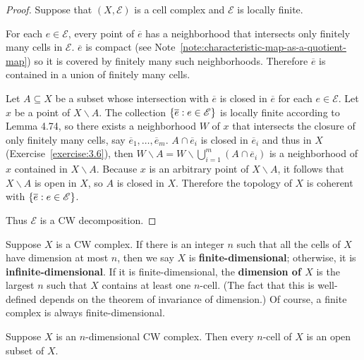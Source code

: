 \begin{proof}
	Suppose that $(X, \mathscr{E})$ is a cell complex and $\mathscr{E}$ is locally finite.

	For each $e\in \mathscr{E}$, every point of $\overline{e}$ has a neighborhood that intersects only finitely many cells in $\mathscr{E}$. $\overline{e}$ is compact (see Note~\ref{note:characteristic-map-as-a-quotient-map}) so it is covered by finitely many such neighborhoods. Therefore $\overline{e}$ is contained in a union of finitely many cells.

	Let $A \subseteq X$ be a subset whose intersection with $\overline{e}$ is closed in $\overline{e}$ for each $e\in \mathscr{E}$. Let $x$ be a point of $X\smallsetminus A$. The collection $\left\{{ \overline{e} : e\in\mathscr{E} }\right\}$ is locally finite according to Lemma 4.74, so there exists a neighborhood $W$ of $x$ that intersects the closure of only finitely many cells, say $\overline{e}_{1}, \ldots, \overline{e}_{m}$. $A \cap \overline{e}_{i}$ is closed in $\overline{e}_{i}$ and thus in $X$ (Exercise~\ref{exercise:3.6}), then $W\smallsetminus A = W \smallsetminus \bigcup^{m}_{i=1}(A\cap \overline{e}_{i})$ is a neighborhood of $x$ contained in $X\smallsetminus A$. Because $x$ is an arbitrary point of $X\smallsetminus A$, it follows that $X\smallsetminus A$ is open in $X$, so $A$ is closed in $X$. Therefore the topology of $X$ is coherent with $\left\{{ \overline{e} : e \in \mathscr{E} }\right\}$.

	Thus $\mathscr{E}$ is a CW decomposition.
\end{proof}

Suppose $X$ is a CW complex. If there is an integer $n$ such that all the cells of $X$ have dimension at most $n$, then we say $X$ is \textbf{finite-dimensional}; otherwise, it is \textbf{infinite-dimensional}. If it is finite-dimensional, the \textbf{dimension of $X$} is the largest $n$ such that $X$ contains at least one $n$-cell. (The fact that this is well-defined depends on the theorem of invariance of dimension.) Of course, a finite complex is always finite-dimensional.

\begin{prop}{5.5}
	Suppose $X$ is an $n$-dimensional CW complex. Then every $n$-cell of $X$ is an open subset of $X$.
\end{prop}

